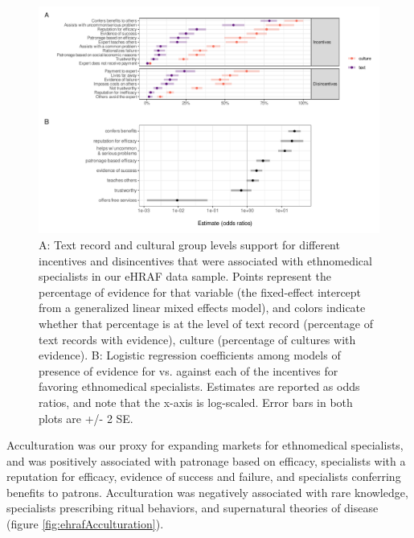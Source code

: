 \documentclass[
  11pt,
]{article}
\begin{document}
\begin{landscape}

\begin{figure}[p]

{\centering \includegraphics{magic-healers-article2_files/figure-latex/ehrafincentivesPlot-1} 

}

\caption{A: Text record and cultural group levels support for different incentives and disincentives that were associated with ethnomedical specialists in our eHRAF data sample. Points represent the percentage of evidence for that variable (the fixed-effect intercept from a generalized linear mixed effects model), and colors indicate whether that percentage is at the level of text record (percentage of text records with evidence), culture (percentage of cultures with evidence). B: Logistic regression coefficients among models of presence of evidence for vs. against each of the incentives for favoring ethnomedical specialists. Estimates are reported as odds ratios, and note that the x-axis is log-scaled. Error bars in both plots are +/- 2 SE.}\label{fig:ehrafincentivesPlot}
\end{figure}

\end{landscape}

Acculturation was our proxy for expanding markets for ethnomedical specialists, and was positively associated with patronage based on efficacy, specialists with a reputation for efficacy, evidence of success and failure, and specialists conferring benefits to patrons. Acculturation was negatively associated with rare knowledge, specialists prescribing ritual behaviors, and supernatural theories of disease (figure \ref{fig:ehrafAcculturation}).
\end{document}
